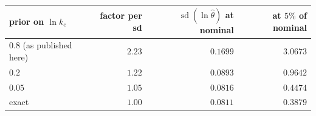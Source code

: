 \begin{tabular}{@{}lrrr@{}}
\toprule
\textbf{prior on $\ln k_e$} & \textbf{factor per sd} & \textbf{$\operatorname{sd}(\ln\hat\theta)$ at nominal} & \textbf{at $5\%$ of nominal} \\
\midrule
$0.8$ (as published here) & $2.23$ & $0.1699$ & $3.0673$ \\
$0.2$ & $1.22$ & $0.0893$ & $0.9642$ \\
$0.05$ & $1.05$ & $0.0816$ & $0.4474$ \\
exact & $1.00$ & $0.0811$ & $0.3879$ \\
\bottomrule
\end{tabular}
